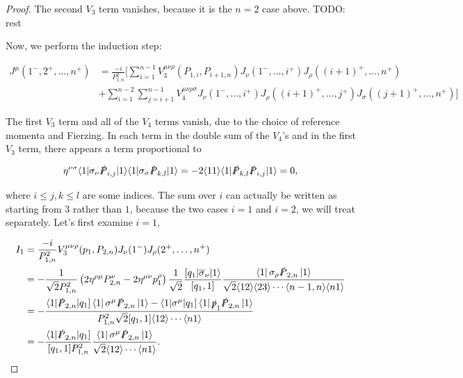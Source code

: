 \documentclass{article}
\theoremstyle{definition}
\numberwithin{equation}{section}
\begin{document}
\begin{proof}
    The second $V_3$ term vanishes, because it is the $n=2$ case above. TODO: rest

    Now, we perform the induction step:

    \begin{align*}
        J^{\mu}(1^{-}, 2^{+}, \dots , n^{+}) &= \frac{-i}{P_{1,n}^2} \Biggl[ \sum_{i=1}^{n-1} V_3^{\mu \nu \rho}(P_{1,i}, P_{i+1,n}) J_{\nu}(1^{-}, \dots, i^{+}) J_{\rho}((i+1)^{+}, \dots , n^{+}) \\
        &+ \sum_{i=1}^{n-2} \sum_{j=i+1}^{n-1} V_4^{\mu \nu \rho \sigma} J_{\nu}(1^{-}, \dots, i^{+}) J_{\rho}((i+1)^{+}, \dots, j^{+})J_{\sigma}((j+1)^{+}, \dots, n^{+}) \Biggr]
    \end{align*}

    The first $V_3$ term and all of the $V_4$ terms vanish, due to the choice of reference momenta and Fierzing. In each term in the double sum of the $V_4$'s and in the first $V_3$ term, there appears a term proportional to

    \begin{align*}
        \eta^{\nu \sigma} \langle 1 | \sigma_{\nu} \slashed{P}_{i,j} | 1 \rangle \langle 1 | \sigma_{\sigma} \slashed{P}_{k,l} | 1 \rangle = - 2 \langle 11 \rangle \langle 1 | \slashed{P}_{k,l} \slashed{P}_{i,j} | 1 \rangle = 0,
    \end{align*}

    where $i \leq j,k \leq l$ are some indices. The sum over $i$ can actually be written as starting from $3$ rather than $1$, because the two cases $i=1$ and $i=2$, we will treat separately. Let's first examine $i=1$,

    \begin{align*}
        I_1 &= \frac{-i}{P_{1,n}^2} V_3^{\mu \nu \rho}(p_{1}, P_{2,n}) J_{\nu}(1^{-}) J_{\rho}(2^{+}, \dots , n^{+}) \\
        &= - \frac{1}{\sqrt{2} P_{1,n}^2} \left( 2 \eta^{\rho \mu} P_{2,n}^{\nu} - 2 \eta^{\mu \nu} p_{1}^{\rho} \right) \frac{1}{\sqrt{2}} \frac{ \lbrack q_1 | \overline{\sigma}_{\nu} | 1 \rangle }{ \lbrack q_1,1 \rbrack } \frac{ \bra{1} \sigma_{\rho} \slashed{P}_{2,n} \ket{1} }{ \sqrt{2} \langle 12 \rangle \langle 23 \rangle \cdots \langle n-1,n \rangle \langle n1 \rangle } \\
        &= - \frac{ \langle 1 | \slashed{P}_{2,n} | q_1 \rbrack \bra{1} \sigma^{\mu} \slashed{P}_{2,n} \ket{1} - \langle 1 | \sigma^{\mu} | q_1 \rbrack \bra{1} \slashed{p}_1 \slashed{P}_{2,n} \ket{1} }{ P_{1,n}^2 \sqrt{2} \lbrack q_1,1 \rbrack \langle 12 \rangle \cdots \langle n1 \rangle } \\
        &= - \frac{ \langle 1 | \slashed{P}_{2,n} | q_1 \rbrack }{ \lbrack q_1,1 \rbrack P_{1,n}^2 } \frac{ \bra{1} \sigma^{\mu} \slashed{P}_{2,n} \ket{1} }{ \sqrt{2} \langle 12 \rangle \cdots \langle n1 \rangle }.
    \end{align*}


\end{proof}
\end{document}
